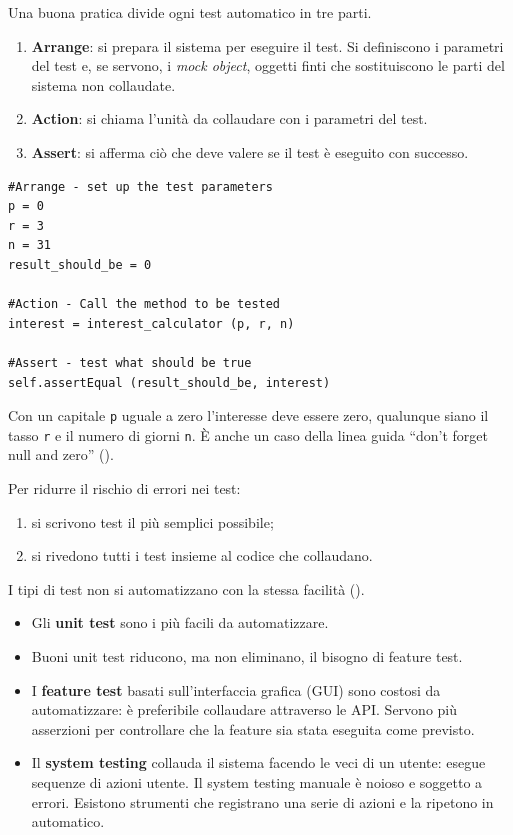 \begin{algoritmo}
Una buona pratica divide ogni test automatico in tre parti.
\begin{enumerate}
  \item \textbf{Arrange}: si prepara il sistema per eseguire il test. Si definiscono i parametri del test e, se
    servono, i \emph{mock object}, oggetti finti che sostituiscono le parti del sistema non collaudate.
  \item \textbf{Action}: si chiama l'unità da collaudare con i parametri del test.
  \item \textbf{Assert}: si afferma ciò che deve valere se il test è eseguito con successo.
\end{enumerate}
\end{algoritmo}

\begin{esempio}
\begin{verbatim}
#Arrange - set up the test parameters
p = 0
r = 3
n = 31
result_should_be = 0

#Action - Call the method to be tested
interest = interest_calculator (p, r, n)

#Assert - test what should be true
self.assertEqual (result_should_be, interest)
\end{verbatim}
Con un capitale \texttt{p} uguale a zero l'interesse deve essere zero, qualunque siano il tasso \texttt{r} e il numero
di giorni \texttt{n}. È anche un caso della linea guida ``don't forget null and zero'' ().
\end{esempio}

\begin{attenzione}
Per ridurre il rischio di errori nei test:
\begin{enumerate}
  \item si scrivono test il più semplici possibile;
  \item si rivedono tutti i test insieme al codice che collaudano.
\end{enumerate}
\end{attenzione}

I tipi di test non si automatizzano con la stessa facilità ().
\begin{itemize}
  \item Gli \textbf{unit test} sono i più facili da automatizzare.
  \item Buoni unit test riducono, ma non eliminano, il bisogno di feature test.
  \item I \textbf{feature test} basati sull'interfaccia grafica (GUI) sono costosi da automatizzare: è preferibile
    collaudare attraverso le API. Servono più asserzioni per controllare che la feature sia stata eseguita come
    previsto.
  \item Il \textbf{system testing} collauda il sistema facendo le veci di un utente: esegue sequenze di azioni utente.
    Il system testing manuale è noioso e soggetto a errori. Esistono strumenti che registrano una serie di azioni e la
    ripetono in automatico.
\end{itemize}

